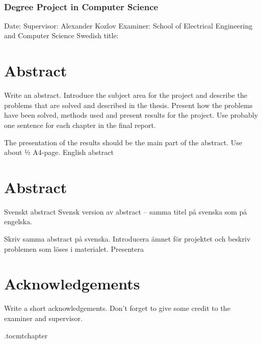 \newpage
\thispagestyle{plain}
~\\
\vfill
{ 
	\subsection*{Degree Project in Computer Science}
	Date:
	Supervisor: Alexander Kozlov
	Examiner:
	School of Electrical Engineering and Computer Science
	Swedish title:
	~
}


\newpage
\thispagestyle{plain}
\chapter*{Abstract}
Write an abstract. Introduce the subject area for the project and describe the problems that are solved and described in the thesis. Present how the problems have been solved, methods used and present results for the project. Use probably one sentence for each chapter in the final report.

The presentation of the results should be the main part of the abstract. Use about ½ A4-page.
English abstract


\newpage
\thispagestyle{plain}
\chapter*{Abstract}
Svenskt abstract
Svensk version av abstract – samma titel på svenska som på engelska.

Skriv samma abstract på svenska. Introducera ämnet för projektet och beskriv problemen som löses i materialet. Presentera


\newpage
\thispagestyle{plain}
\chapter*{Acknowledgements}
Write a short acknowledgements. Don't forget to give some credit to the examiner and supervisor.

\newpage

\etocdepthtag.toc{mtchapter}
\thispagestyle{plain}
\tableofcontents

\newpage


